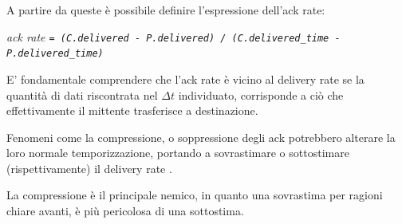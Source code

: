 A partire da queste è possibile definire l'espressione dell'ack rate:

\begin{center}

\textit{ack rate \texttt{= (C.delivered - P.delivered) / (C.delivered\_time - P.delivered\_time)}}

\end{center}

E' fondamentale comprendere che l'ack rate è vicino al delivery rate se la quantità di dati riscontrata nel $ \Delta t$ individuato, corrisponde a ciò che effettivamente il mittente trasferisce a destinazione.\bigskip

Fenomeni come la compressione, o soppressione degli ack potrebbero alterare la loro normale temporizzazione, portando a sovrastimare o sottostimare (rispettivamente) il delivery rate \cite{ietf:ack-suppression}. \bigskip

La compressione è il principale nemico, in quanto una sovrastima per ragioni chiare avanti, è più pericolosa di una sottostima. \bigskip

